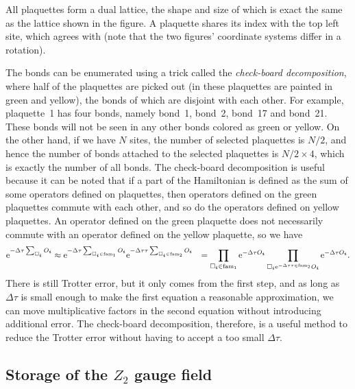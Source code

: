\documentclass[hyperref, a4paper]{article}
\newcommand*{\ee}{\mathrm{e}}
\newcommand*{\Ztwo}{\texorpdfstring{$\mathbb{Z}_2$ }{Z2 }}
\def\\{}%
\def\mathbb#1{#1}%
\begin{document}
All plaquettes form a dual lattice, the shape and size of which is exact the same as the lattice shown in the figure.
A plaquette shares its index with the top left site, 
which agrees with  (note that the two figures' coordinate systems differ in a rotation).

The bonds can be enumerated using a trick called the \emph{check-board decomposition}, 
where half of the plaquettes are picked out
(in  these plaquettes are painted in green and yellow), 
the bonds of which are disjoint with each other.
For example, plaquette~1 has four bonds, namely bond~1, bond~2, bond~17 and bond~21.
These bonds will not be seen in any other bonds colored as green or yellow.
On the other hand, if we have $N$ sites, the number of selected plaquettes is $N/2$, 
and hence the number of bonds attached to the selected plaquettes is $N/2 \times 4$, which is exactly the number of all bonds.
The check-board decomposition is useful because it can be noted that if a part of the Hamiltonian is defined as the sum of some operators defined on plaquettes, 
then operators defined on the green plaquettes commute with each other, and so do the operators defined on yellow plaquettes.
An operator defined on the green plaquette does not necessarily commute with an operator defined on the yellow plaquette,
so we have 
\begin{equation}
    \begin{aligned}
        \ee^{-\Delta \tau \sum_{\Box_{\vb*{i}}} O_{\vb*{i}}} &\approx \ee^{- \Delta \tau \sum_{\Box_{\vb*{i}} \in \mathrm{fam}_1} O_{\vb*{i}}} \ee^{- \Delta \tau \tau \sum_{\Box_{\vb*{i}} \in \mathrm{fam}_2} O_{\vb*{i}}}  \\
        &= \prod_{\Box_{\vb*{i}} \in \mathrm{fam}_1} \ee^{- \Delta \tau O_{\vb*{i}}} \prod_{\Box_{\vb*{i}} \ee^{- \Delta \tau \tau \in \mathrm{fam}_2} O_{\vb*{i}}} \ee^{- \Delta \tau O_{\vb*{i}}}.
    \end{aligned}
\end{equation}
There is still Trotter error, but it only comes from the first step, and as long as $\Delta \tau$ is small enough to make the first equation a reasonable approximation, we can move multiplicative factors in the second equation without introducing additional error.
The check-board decomposition, therefore, is a useful method to reduce the Trotter error without having to accept a too small $\Delta \tau$.

\subsection{Storage of the \Ztwo gauge field}
\end{document}

